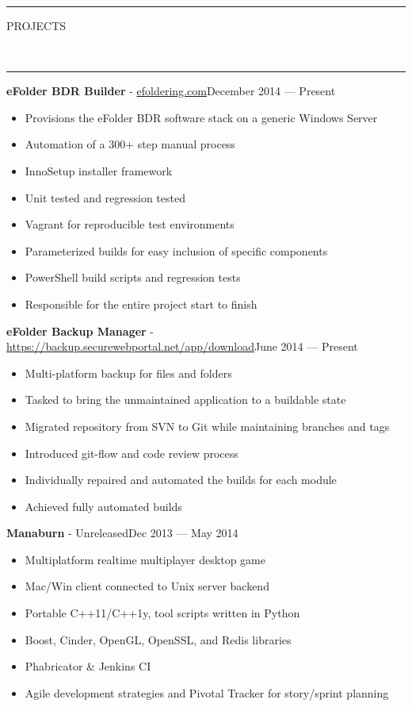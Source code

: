 \documentclass[10pt, letterpaper, oneside]{article}
\newcommand{\HRule}[2]{\textcolor{#1}{\rule{\linewidth}{#2}}}
\newcommand{\sectiontitle}[1]{\begin{minipage}{\textwidth}\HRule{black}{0.25mm}\vspace{-10pt}\begin{center}\Large\MakeUppercase{#1}\end{center}\end{minipage}\\\HRule{light-grey}{0.15mm}\vspace{\baselineskip}}
\newenvironment{ressection}[1]{
  \sectiontitle{#1}}
  {\vspace{0.5\baselineskip}}
\newcommand{\resitem}[1]{
    \vspace{2pt}
    \item \begin{flushleft} #1 \end{flushleft}
}
\newcommand{\resentryheader}[3]{
    \vspace{-5pt}
    \textbf{#1} - #2\hspace{\stretch{1}}\textcolor{light-grey}{#3}\\
}
\newenvironment{resentry}[3]{
  \begin{minipage}{\textwidth}
    \resentryheader{#1}{#2}{#3}
        \vspace{-\baselineskip}
    \begin{itemize}[noitemsep,nolistsep]
}{
    \end{itemize}
        \vspace{\baselineskip}
        \end{minipage}
}
\begin{document}
\begin{ressection}{Projects}
  \begin{resentry}{eFolder BDR Builder}{\href{https://secure.efoldering.com/support/index.php?/efolder/Knowledgebase/Article/View/373/56/efolder-bdr-builder-setup-utility-download}{efoldering.com}}{December 2014 --- Present}
    \resitem{Provisions the eFolder BDR software stack on a generic Windows Server}
    \resitem{Automation of a 300+ step manual process}
    \resitem{InnoSetup installer framework}
    \resitem{Unit tested and regression tested}
    \resitem{Vagrant for reproducible test environments}
    \resitem{Parameterized builds for easy inclusion of specific components}
    \resitem{PowerShell build scripts and regression tests}
    \resitem{Responsible for the entire project start to finish}
  \end{resentry}

  \begin{resentry}{eFolder Backup Manager}{\href{https://backup.securewebportal.net/app/download}{https://backup.securewebportal.net/app/download}}{June 2014 --- Present}
    \resitem{Multi-platform backup for files and folders}
    \resitem{Tasked to bring the unmaintained application to a buildable state}
    \resitem{Migrated repository from SVN to Git while maintaining branches and tags}
    \resitem{Introduced git-flow and code review process}
    \resitem{Individually repaired and automated the builds for each module}
    \resitem{Achieved fully automated builds}
  \end{resentry}

  \begin{resentry}{Manaburn}{Unreleased}{Dec 2013 --- May 2014}
    \resitem{Multiplatform realtime multiplayer desktop game}
    \resitem{Mac/Win client connected to Unix server backend}
    \resitem{Portable C++11/C++1y, tool scripts written in Python}
    \resitem{Boost, Cinder, OpenGL, OpenSSL, and Redis libraries}
    \resitem{Phabricator \& Jenkins CI}
    \resitem{Agile development strategies and Pivotal Tracker for story/sprint planning}
  \end{resentry}
\end{ressection}
\end{document}
